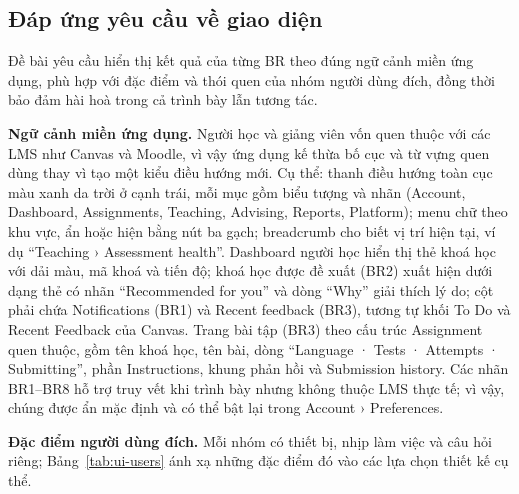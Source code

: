 \subsection{Đáp ứng yêu cầu về giao diện}
\label{sec:ui-criteria}

Đề bài yêu cầu hiển thị kết quả của từng BR theo đúng ngữ cảnh miền ứng dụng, phù hợp với đặc điểm và thói quen của nhóm người dùng đích, đồng thời bảo đảm hài hoà trong cả trình bày lẫn tương tác.

\textbf{Ngữ cảnh miền ứng dụng.} Người học và giảng viên vốn quen thuộc với các LMS như Canvas và Moodle, vì vậy ứng dụng kế thừa bố cục và từ vựng quen dùng thay vì tạo một kiểu điều hướng mới. Cụ thể: thanh điều hướng toàn cục màu xanh da trời ở cạnh trái, mỗi mục gồm biểu tượng và nhãn (Account, Dashboard, Assignments, Teaching, Advising, Reports, Platform); menu chữ theo khu vực, ẩn hoặc hiện bằng nút ba gạch; breadcrumb cho biết vị trí hiện tại, ví dụ ``Teaching › Assessment health''. Dashboard người học hiển thị thẻ khoá học với dải màu, mã khoá và tiến độ; khoá học được đề xuất (BR2) xuất hiện dưới dạng thẻ có nhãn ``Recommended for you'' và dòng ``Why'' giải thích lý do; cột phải chứa Notifications (BR1) và Recent feedback (BR3), tương tự khối To Do và Recent Feedback của Canvas. Trang bài tập (BR3) theo cấu trúc Assignment quen thuộc, gồm tên khoá học, tên bài, dòng ``Language · Tests · Attempts · Submitting'', phần Instructions, khung phản hồi và Submission history. Các nhãn BR1--BR8 hỗ trợ truy vết khi trình bày nhưng không thuộc LMS thực tế; vì vậy, chúng được ẩn mặc định và có thể bật lại trong Account › Preferences.

\textbf{Đặc điểm người dùng đích.} Mỗi nhóm có thiết bị, nhịp làm việc và câu hỏi riêng; Bảng~\ref{tab:ui-users} ánh xạ những đặc điểm đó vào các lựa chọn thiết kế cụ thể.

